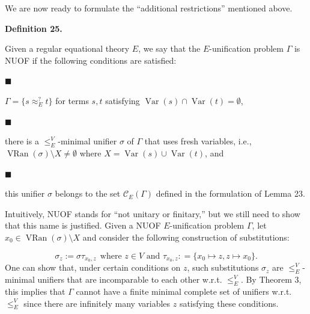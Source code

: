 \documentclass[10pt,a4paper]{amsart}
\begin{document}
 
 
We are now ready to formulate the “additional restrictions” mentioned above.\par
 
 
 
\par\medskip\noindent\textbf{Definition 25.}\par
 
 
Given a regular equational theory $E$, we say that the $E$-unification problem $\Gamma$ is NUOF if the following conditions are satisfied:\par
  
\par\noindent  $\blacksquare$ 
 
$\Gamma=\{s\approx_{E}^{?}t\}$ for terms $s,t$ satisfying $\operatorname{Var}(s)\cap\operatorname{Var}(t)=\emptyset$,\par
 
 
 
\par\noindent  $\blacksquare$ 
 
there is a $\leq_{E}^{V}$-minimal unifier $\sigma$ of $\Gamma$ that uses fresh variables, i.e., $\operatorname{VRan}(\sigma)\setminus X\neq\emptyset$ where $X=\operatorname{Var}(s)\cup\operatorname{Var}(t)$, and\par
 
 
 
\par\noindent  $\blacksquare$ 
 
this unifier $\sigma$ belongs to the set $\mathcal{C}_{E}(\Gamma)$ defined in the formulation of Lemma 23.\par
 
 
  
 
 
 
Intuitively, NUOF stands for “not unitary or finitary,” but we still need to show that this name is justified. Given a NUOF $E$-unification problem $\Gamma$, let $x_{0}\in\operatorname{VRan}(\sigma)\setminus X$ and consider the following construction of substitutions:\par
    \[\sigma_{z}:=\sigma\tau_{x_{0},z}\ \ \mbox{where $z\in{V}$ and $\tau_{x_{0},z}:%
=\{x_{0}\mapsto z,z\mapsto x_{0}\}$}.\]    
One can show that, under certain conditions on $z$, such substitutions $\sigma_{z}$ are $\leq_{E}^{V}$-minimal unifiers that are incomparable to each other w.r.t. $\leq_{E}^{V}$. By Theorem 3, this implies that $\Gamma$ cannot have a finite minimal complete set of unifiers w.r.t. $\leq_{E}^{V}$ since there are infinitely many variables $z$ satisfying these conditions.\par
 
\end{document}

